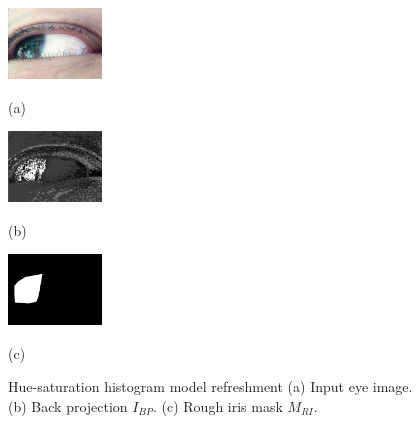 \documentclass[sigconf]{acmart}
\begin{document}
\begin{figure}[t]
\begin{minipage}[b]{0.32\linewidth}
  \centering
  \centerline{\includegraphics[width=2.5cm]{../Fig/IrisModelUpdating/ImageForValidTesting.jpg}}
  \centerline{(a)}\medskip
\end{minipage}
\hfill
\begin{minipage}[b]{0.32\linewidth}
  \centering
  \centerline{\includegraphics[width=2.5cm]{../Fig/IrisModelUpdating/BackProjection.jpg}}
  \centerline{(b)}\medskip
\end{minipage}
%
\hfill
\begin{minipage}[b]{0.32\linewidth}
  \centering
  \centerline{\includegraphics[width=2.5cm]{../Fig/IrisModelUpdating/IrisRegion.jpg}}
  \centerline{(c)}\medskip
\end{minipage}
%
\caption{Hue-saturation histogram model refreshment (a) Input eye image. (b) Back projection $I_{BP}$.
		(c) Rough iris mask $M_{RI}$.}
\label{fig:BPF}
\end{figure}
\end{document}
